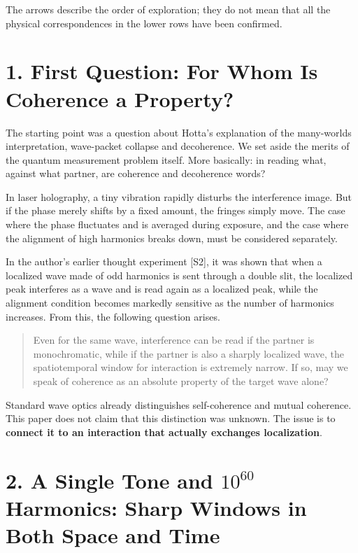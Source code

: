 \documentclass[
  a4paper,
]{article}
\begin{document}
The arrows describe the order of exploration; they do not mean that all
the physical correspondences in the lower rows have been confirmed.

\section{1. First Question: For Whom Is Coherence a
Property?}\label{first-question-for-whom-is-coherence-a-property}

The starting point was a question about Hotta's explanation of the
many-worlds interpretation, wave-packet collapse and decoherence. We set
aside the merits of the quantum measurement problem itself. More
basically: in reading what, against what partner, are coherence and
decoherence words?

In laser holography, a tiny vibration rapidly disturbs the interference
image. But if the phase merely shifts by a fixed amount, the fringes
simply move. The case where the phase fluctuates and is averaged during
exposure, and the case where the alignment of high harmonics breaks
down, must be considered separately.

In the author's earlier thought experiment {[}S2{]}, it was shown that
when a localized wave made of odd harmonics is sent through a double
slit, the localized peak interferes as a wave and is read again as a
localized peak, while the alignment condition becomes markedly sensitive
as the number of harmonics increases. From this, the following question
arises.

\begin{quote}
Even for the same wave, interference can be read if the partner is
monochromatic, while if the partner is also a sharply localized wave,
the spatiotemporal window for interaction is extremely narrow. If so,
may we speak of coherence as an absolute property of the target wave
alone?
\end{quote}

Standard wave optics already distinguishes self-coherence and mutual
coherence. This paper does not claim that this distinction was unknown.
The issue is to \textbf{connect it to an interaction that actually
exchanges localization}.

\section{\texorpdfstring{2. A Single Tone and \(10^{60}\) Harmonics:
Sharp Windows in Both Space and
Time}{2. A Single Tone and 10\^{}\{60\} Harmonics: Sharp Windows in Both Space and Time}}\label{a-single-tone-and-1060-harmonics-sharp-windows-in-both-space-and-time}
\end{document}
